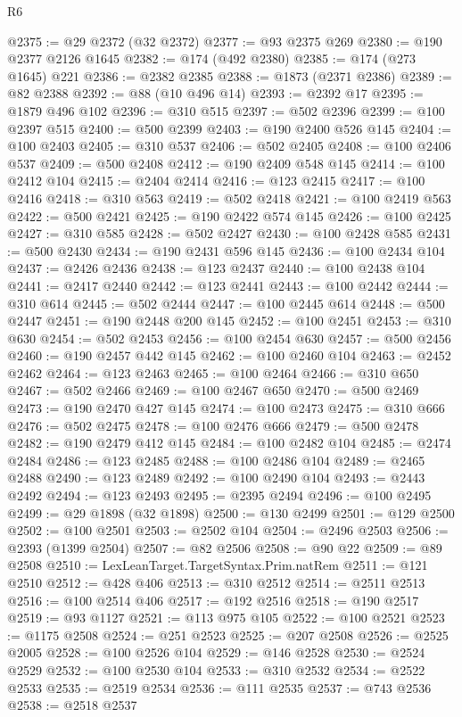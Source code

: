 \begin{lexlean}{R6}
\begin{coremodule}
@2375 := @29 @2372 (@32 @2372)
@2377 := @93 @2375 @269
@2380 := @190 @2377 @2126 @1645
@2382 := @174 (@492 @2380)
@2385 := @174 (@273 @1645) @221
@2386 := @2382 @2385
@2388 := @1873 (@2371 @2386)
@2389 := @82 @2388
@2392 := @88 (@10 @496 @14)
@2393 := @2392 @17
@2395 := @1879 @496 @102
@2396 := @310 @515
@2397 := @502 @2396
@2399 := @100 @2397 @515
@2400 := @500 @2399
@2403 := @190 @2400 @526 @145
@2404 := @100 @2403
@2405 := @310 @537
@2406 := @502 @2405
@2408 := @100 @2406 @537
@2409 := @500 @2408
@2412 := @190 @2409 @548 @145
@2414 := @100 @2412 @104
@2415 := @2404 @2414
@2416 := @123 @2415
@2417 := @100 @2416
@2418 := @310 @563
@2419 := @502 @2418
@2421 := @100 @2419 @563
@2422 := @500 @2421
@2425 := @190 @2422 @574 @145
@2426 := @100 @2425
@2427 := @310 @585
@2428 := @502 @2427
@2430 := @100 @2428 @585
@2431 := @500 @2430
@2434 := @190 @2431 @596 @145
@2436 := @100 @2434 @104
@2437 := @2426 @2436
@2438 := @123 @2437
@2440 := @100 @2438 @104
@2441 := @2417 @2440
@2442 := @123 @2441
@2443 := @100 @2442
@2444 := @310 @614
@2445 := @502 @2444
@2447 := @100 @2445 @614
@2448 := @500 @2447
@2451 := @190 @2448 @200 @145
@2452 := @100 @2451
@2453 := @310 @630
@2454 := @502 @2453
@2456 := @100 @2454 @630
@2457 := @500 @2456
@2460 := @190 @2457 @442 @145
@2462 := @100 @2460 @104
@2463 := @2452 @2462
@2464 := @123 @2463
@2465 := @100 @2464
@2466 := @310 @650
@2467 := @502 @2466
@2469 := @100 @2467 @650
@2470 := @500 @2469
@2473 := @190 @2470 @427 @145
@2474 := @100 @2473
@2475 := @310 @666
@2476 := @502 @2475
@2478 := @100 @2476 @666
@2479 := @500 @2478
@2482 := @190 @2479 @412 @145
@2484 := @100 @2482 @104
@2485 := @2474 @2484
@2486 := @123 @2485
@2488 := @100 @2486 @104
@2489 := @2465 @2488
@2490 := @123 @2489
@2492 := @100 @2490 @104
@2493 := @2443 @2492
@2494 := @123 @2493
@2495 := @2395 @2494
@2496 := @100 @2495
@2499 := @29 @1898 (@32 @1898)
@2500 := @130 @2499
@2501 := @129 @2500
@2502 := @100 @2501
@2503 := @2502 @104
@2504 := @2496 @2503
@2506 := @2393 (@1399 @2504)
@2507 := @82 @2506
@2508 := @90 @22
@2509 := @89 @2508
@2510 := LexLeanTarget.TargetSyntax.Prim.natRem
@2511 := @121 @2510
@2512 := @428 @406
@2513 := @310 @2512
@2514 := @2511 @2513
@2516 := @100 @2514 @406
@2517 := @192 @2516
@2518 := @190 @2517
@2519 := @93 @1127
@2521 := @113 @975 @105
@2522 := @100 @2521
@2523 := @1175 @2508
@2524 := @251 @2523
@2525 := @207 @2508
@2526 := @2525 @2005
@2528 := @100 @2526 @104
@2529 := @146 @2528
@2530 := @2524 @2529
@2532 := @100 @2530 @104
@2533 := @310 @2532
@2534 := @2522 @2533
@2535 := @2519 @2534
@2536 := @111 @2535
@2537 := @743 @2536
@2538 := @2518 @2537

\end{coremodule}
\end{lexlean}
